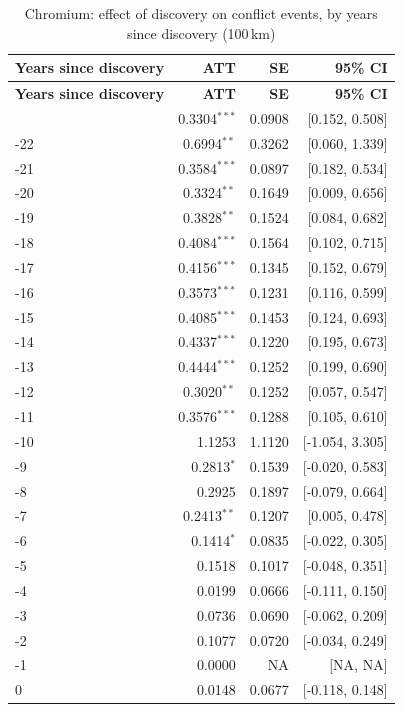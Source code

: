 \begin{longtable}{lrrr}
\caption{Chromium: effect of discovery on conflict events, by years since discovery (100\,km)} \label{tab:chromium_all_conflict_events} \\
\toprule
\textbf{Years since discovery} & \textbf{ATT} & \textbf{SE} & \textbf{95\% CI} \\
\midrule \endfirsthead
\toprule
\textbf{Years since discovery} & \textbf{ATT} & \textbf{SE} & \textbf{95\% CI} \\
\midrule \endhead
\bottomrule \endlastfoot
-23 & 0.3304$^{***}$ & 0.0908 & [0.152, 0.508] \\
-22 & 0.6994$^{**}$ & 0.3262 & [0.060, 1.339] \\
-21 & 0.3584$^{***}$ & 0.0897 & [0.182, 0.534] \\
-20 & 0.3324$^{**}$ & 0.1649 & [0.009, 0.656] \\
-19 & 0.3828$^{**}$ & 0.1524 & [0.084, 0.682] \\
-18 & 0.4084$^{***}$ & 0.1564 & [0.102, 0.715] \\
-17 & 0.4156$^{***}$ & 0.1345 & [0.152, 0.679] \\
-16 & 0.3573$^{***}$ & 0.1231 & [0.116, 0.599] \\
-15 & 0.4085$^{***}$ & 0.1453 & [0.124, 0.693] \\
-14 & 0.4337$^{***}$ & 0.1220 & [0.195, 0.673] \\
-13 & 0.4444$^{***}$ & 0.1252 & [0.199, 0.690] \\
-12 & 0.3020$^{**}$ & 0.1252 & [0.057, 0.547] \\
-11 & 0.3576$^{***}$ & 0.1288 & [0.105, 0.610] \\
-10 & 1.1253 & 1.1120 & [-1.054, 3.305] \\
-9 & 0.2813$^{*}$ & 0.1539 & [-0.020, 0.583] \\
-8 & 0.2925 & 0.1897 & [-0.079, 0.664] \\
-7 & 0.2413$^{**}$ & 0.1207 & [0.005, 0.478] \\
-6 & 0.1414$^{*}$ & 0.0835 & [-0.022, 0.305] \\
-5 & 0.1518 & 0.1017 & [-0.048, 0.351] \\
-4 & 0.0199 & 0.0666 & [-0.111, 0.150] \\
-3 & 0.0736 & 0.0690 & [-0.062, 0.209] \\
-2 & 0.1077 & 0.0720 & [-0.034, 0.249] \\
-1 & 0.0000 & NA & [NA, NA] \\
0 & 0.0148 & 0.0677 & [-0.118, 0.148] \\

\end{longtable}
